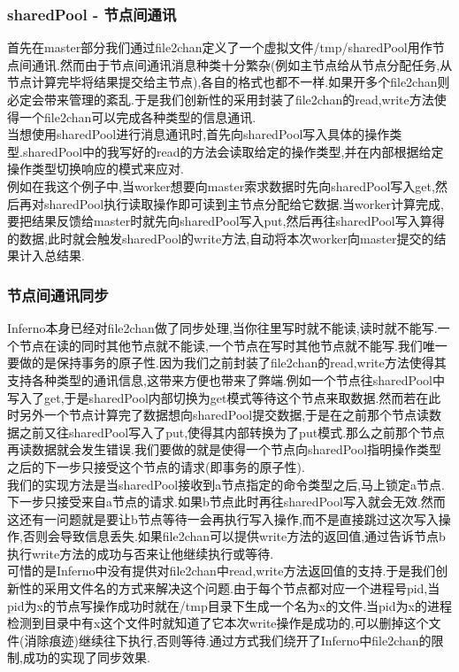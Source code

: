 \documentclass[paper=a4]{ctexart} %
\numberwithin{equation}{section} %
\numberwithin{figure}{section} %
\numberwithin{table}{section} %
\newcommand{\n}{\\\indent}
\begin{document}
\subsubsection{sharedPool - 节点间通讯}

首先在master部分我们通过file2chan定义了一个虚拟文件/tmp/sharedPool用作节点间通讯.然而由于节点间通讯消息种类十分繁杂(例如主节点给从节点分配任务,从节点计算完毕将结果提交给主节点),各自的格式也都不一样.如果开多个file2chan则必定会带来管理的紊乱.于是我们创新性的采用封装了file2chan的read,write方法使得一个file2chan可以完成各种类型的信息通讯. \n
当想使用sharedPool进行消息通讯时,首先向sharedPool写入具体的操作类型.sharedPool中的我写好的read的方法会读取给定的操作类型,并在内部根据给定操作类型切换响应的模式来应对. \n
例如在我这个例子中,当worker想要向master索求数据时先向sharedPool写入get,然后再对sharedPool执行读取操作即可读到主节点分配给它数据.当worker计算完成,要把结果反馈给master时就先向sharedPool写入put,然后再往sharedPool写入算得的数据,此时就会触发sharedPool的write方法,自动将本次worker向master提交的结果计入总结果.

\subsubsection{节点间通讯同步}
Inferno本身已经对file2chan做了同步处理,当你往里写时就不能读,读时就不能写.一个节点在读的同时其他节点就不能读,一个节点在写时其他节点就不能写.我们唯一要做的是保持事务的原子性.因为我们之前封装了file2chan的read,write方法使得其支持各种类型的通讯信息,这带来方便也带来了弊端.例如一个节点往sharedPool中写入了get,于是sharedPool内部切换为get模式等待这个节点来取数据.然而若在此时另外一个节点计算完了数据想向sharedPool提交数据,于是在之前那个节点读数据之前又往sharedPool写入了put,使得其内部转换为了put模式.那么之前那个节点再读数据就会发生错误.我们要做的就是使得一个节点向sharedPool指明操作类型之后的下一步只接受这个节点的请求(即事务的原子性). \n
我们的实现方法是当sharedPool接收到a节点指定的命令类型之后,马上锁定a节点.下一步只接受来自a节点的请求.如果b节点此时再往sharedPool写入就会无效.然而这还有一问题就是要让b节点等待一会再执行写入操作,而不是直接跳过这次写入操作,否则会导致信息丢失.如果file2chan可以提供write方法的返回值,通过告诉节点b执行write方法的成功与否来让他继续执行或等待.\n
可惜的是Inferno中没有提供对file2chan中read,write方法返回值的支持.于是我们创新性的采用文件名的方式来解决这个问题.由于每个节点都对应一个进程号pid,当pid为x的节点写操作成功时就在/tmp目录下生成一个名为x的文件.当pid为x的进程检测到目录中有x这个文件时就知道了它本次write操作是成功的,可以删掉这个文件(消除痕迹)继续往下执行,否则等待.通过方式我们绕开了Inferno中file2chan的限制,成功的实现了同步效果.
\end{document}
